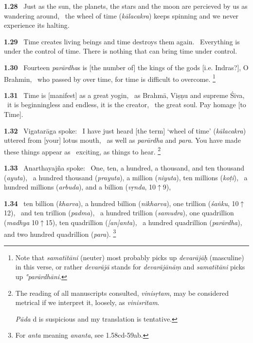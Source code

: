 \documentclass{article}
\newcommand{\skt}[1]{\textit{#1}}
\begin{document}
\textbf{1.28}%
\ Just as the sun, the planets, the stars and the moon are percieved by us as wandering around,%
\ the wheel of time (\skt{kālacakra}) keeps spinning and we never experience its halting.%


\textbf{1.29}%
\ Time creates living beings and time destroys them again.%
\ Everything is under the control of time. There is nothing that can bring time under control.%


\textbf{1.30}%
\ Fourteen \skt{parārdha}s is [the number of] the kings of the gods [i.e. Indras?], O Brahmin,%
\ who passed by over time, for time is difficult to overcome.%
\footnote{Note that \skt{samatītāni} (neuter) most probably picks up \skt{devarājāḥ}                (masculine) in this verse, or rather \skt{devarājā} stands for                \skt{devarājānāṃ} and \skt{samatītāni} picks up \skt{°parārdhāni}. }%


\textbf{1.31}%
\ Time is [manifest] as a great yogin,%
\                         as Brahmā, Viṣṇu and supreme Śiva,%
\ it is beginningless and endless, it is the creator,%
\                                 the great soul. Pay homage [to Time].%


\textbf{1.32}%
\ Vigatarāga spoke:%
\ I have just heard [the term] `wheel of time' (\skt{kālacakra}) uttered from [your] lotus mouth,%
\ as well as \skt{parārdha} and \skt{para}. You have made these things appear as%
\                              exciting, as things to hear.%
\footnote{The reading of all manuscripts consulted, \skt{vinisṛtam},                 may be considered metrical if we interpret it, loosely, as \skt{vinisritam}.        

                \skt{Pāda} d is suspicious and my translation is tentative. }%


\textbf{1.33}%
\ Anarthayajña spoke:%
\ One, ten, a hundred, a thousand, and ten thousand (\skt{ayuta}),%
\ a hundred thousand (\skt{prayuta}), a million (\skt{niyuta}), ten millions (\skt{koṭi}),%
\              a hundred millions (\skt{arbuda}), and a billion (\skt{vṛnda}, 10${\uparrow}$9),%


\textbf{1.34}%
\ ten billion (\skt{kharva}), a hundred billion (\skt{nikharva}), one trillion (\skt{śaṅku}, 10${\uparrow}$12),%
\              and ten trillion (\skt{padma}),%
\ a hundred trillion (\skt{samudra}), one quadrillion (\skt{madhya} 10${\uparrow}$15), ten quadrillion (\skt{[an]anta}),%
\                          a hundred quadrillion (\skt{parārdha}), and two hundred quadrillion (\skt{para}).%
\footnote{For \skt{anta} meaning \skt{ananta}, see 1.58cd-59ab. }%
\end{document}
